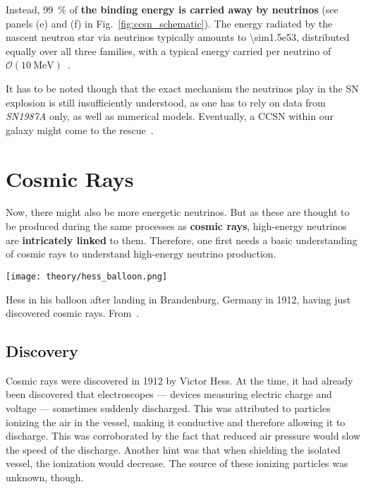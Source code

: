 Instead, \SI{99}{\percent} of \textbf{the binding energy is carried away by neutrinos} (see panels (e) and (f) in Fig.~\ref{fig:ccsn_schematic}). The energy radiated by the nascent neutron star via neutrinos typically amounts to \SI{\sim1.5e53}{\erg}, distributed equally over all three families, with a typical energy carried per neutrino of $\mathcal{O}(\SI{10}{\mega\eV})$~.

It has to be noted though that the exact mechanism the neutrinos play in the SN explosion is still insufficiently understood, as one has to rely on data from \emph{SN1987A} only, as well as numerical models. Eventually, a CCSN within our galaxy might come to the rescue~.

\section{Cosmic Rays}\label{cosmic_rays}

Now, there might also be more energetic neutrinos. But as these are thought to be produced during the same processes as \textbf{cosmic rays}, high-energy neutrinos are \textbf{intricately linked} to them. Therefore, one first needs a basic understanding of cosmic rays to understand high-energy neutrino production.

\begin{marginfigure}
    \texttt{[image: theory/hess\_balloon.png]}
    \caption[Hess in his balloon]{Hess in his balloon after landing in Brandenburg, Germany in 1912, having just discovered cosmic rays. From~\cite{Steinmaurer1985}.}
\end{marginfigure}

\subsection{Discovery}

Cosmic rays were discovered in 1912 by Victor Hess. At the time, it had already been discovered that electroscopes --- devices measuring electric charge and voltage --- sometimes suddenly discharged. This was attributed to particles ionizing the air in the vessel, making it conductive and therefore allowing it to discharge. This was corroborated by the fact that reduced air pressure would slow the speed of the discharge. Another hint was that when shielding the isolated vessel, the ionization would decrease. The source of these ionizing particles was unknown, though.

